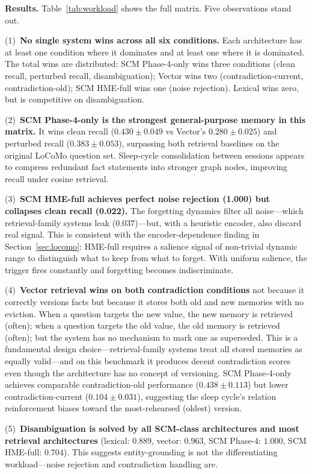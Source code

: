 \documentclass[11pt,twocolumn]{article}
\begin{document}
\textbf{Results.} Table~\ref{tab:workload} shows the full matrix. Five observations stand out.

(1)~\textbf{No single system wins across all six conditions.} Each architecture has at least one condition where it dominates and at least one where it is dominated. The total wins are distributed: SCM Phase-4-only wins three conditions (clean recall, perturbed recall, disambiguation); Vector wins two (contradiction-current, contradiction-old); SCM HME-full wins one (noise rejection). Lexical wins zero, but is competitive on disambiguation.

(2)~\textbf{SCM Phase-4-only is the strongest general-purpose memory in this matrix.} It wins clean recall ($0.430\pm0.049$ vs Vector's $0.280\pm0.025$) and perturbed recall ($0.383\pm0.053$), surpassing both retrieval baselines on the original LoCoMo question set. Sleep-cycle consolidation between sessions appears to compress redundant fact statements into stronger graph nodes, improving recall under cosine retrieval.

(3)~\textbf{SCM HME-full achieves perfect noise rejection (1.000) but collapses clean recall (0.022).} The forgetting dynamics filter all noise---which retrieval-family systems leak ($0.037$)---but, with a heuristic encoder, also discard real signal. This is consistent with the encoder-dependence finding in Section~\ref{sec:locomo}: HME-full requires a salience signal of non-trivial dynamic range to distinguish what to keep from what to forget. With uniform salience, the trigger fires constantly and forgetting becomes indiscriminate.

(4)~\textbf{Vector retrieval wins on both contradiction conditions} not because it correctly versions facts but because it stores both old and new memories with no eviction. When a question targets the new value, the new memory is retrieved (often); when a question targets the old value, the old memory is retrieved (often); but the system has no mechanism to mark one as superseded. This is a fundamental design choice---retrieval-family systems treat all stored memories as equally valid---and on this benchmark it produces decent contradiction scores even though the architecture has no concept of versioning. SCM Phase-4-only achieves comparable contradiction-old performance ($0.438\pm0.113$) but lower contradiction-current ($0.104\pm0.031$), suggesting the sleep cycle's relation reinforcement biases toward the most-rehearsed (oldest) version.

(5)~\textbf{Disambiguation is solved by all SCM-class architectures and most retrieval architectures} (lexical: $0.889$, vector: $0.963$, SCM Phase-4: $1.000$, SCM HME-full: $0.704$). This suggests entity-grounding is not the differentiating workload---noise rejection and contradiction handling are.
\end{document}
